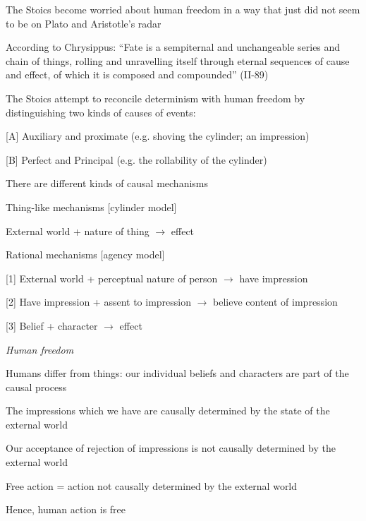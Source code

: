 \documentclass[11pt]{article}
\begin{document}
\noindent The Stoics become worried about human freedom in a way that just did not seem to be on Plato and Aristotle's radar
\vspace*{2mm}

\noindent According to Chrysippus: ``Fate is a sempiternal and unchangeable series and chain of things, rolling and unravelling itself through eternal sequences of cause and effect, of which it is composed and compounded'' (II-89)
\vspace*{2mm}

\noindent The Stoics attempt to reconcile determinism with human freedom by distinguishing two kinds of causes of events:
\vspace*{2mm}

[A] Auxiliary and proximate (e.g. shoving the cylinder; an impression)
\vspace{1mm}

[B] Perfect and Principal (e.g. the rollability of the cylinder)
\vspace*{2mm}

\noindent There are different kinds of causal mechanisms
\vspace*{2mm}

Thing-like mechanisms [cylinder model]
\vspace*{1mm}

\hspace*{5mm} External world + nature of thing $\rightarrow$ effect
\vspace*{1mm}

Rational mechanisms [agency model]
\vspace*{1mm}

\hspace*{5mm} [1] External world + perceptual nature of person $\rightarrow$ have impression
\vspace*{1mm}

\hspace*{5mm} [2] Have impression + assent to impression $\rightarrow$ believe content of impression
\vspace*{1mm}

\hspace*{5mm} [3] Belief + character $\rightarrow$ effect
\vspace*{2mm}

\noindent \emph{Human freedom}
\vspace*{2mm}

\noindent Humans differ from things: our individual beliefs and characters are part of the causal process
\vspace*{1mm}

\noindent The impressions which we have are causally determined by the state of the external world
\vspace*{1mm}

\noindent Our acceptance of rejection of impressions is not causally determined by the external world
\vspace*{1mm}

\noindent Free action = action not causally determined by the external world
\vspace*{1mm}

\noindent Hence, human action is free
\vspace*{-3mm}
\end{document}
